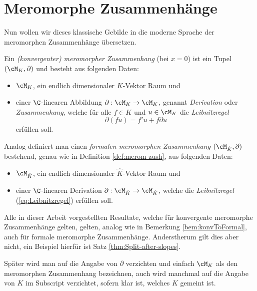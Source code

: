 \section{Meromorphe Zusammenhänge}
Nun wollen wir dieses klassische Gebilde in die moderne Sprache der
meromorphen Zusammenhänge übersetzen.
\begin{defn} \label{def:merom-zush}
Ein \emph{(konvergenter) meromorpher Zusammenhang} (bei $x=0$) ist ein Tupel
$(\cM_K,\partial)$ und besteht aus folgenden Daten:
\begin{itemize}
\item $\cM_K$, ein endlich dimensionaler $K$-Vektor Raum und
\item einer $\C$-linearen Abbildung $\partial:\cM_K\rightarrow \cM_K$,
genannt \emph{Derivation} oder \emph{Zusammenhang}, welche für alle $f\in K$
und $u\in \cM_K$ die \emph{Leibnitzregel}
\begin{equation}\label{eq:Leibnitzregel}
\partial(fu)=f'u+f\partial u %
\end{equation}
erfüllen soll.
\end{itemize}
\end{defn}
\begin{bem} %
Analog definiert man einen \emph{formalen meromorphen Zusammenhang}
$(\cM_{\hat K},\partial)$ bestehend, genau wie in Definition
\ref{def:merom-zush}, aus folgenden Daten:
\begin{itemize}
\item $\cM_{\hat K}$, ein endlich dimensionaler $\hat K$-Vektor Raum und
\item einer $\C$-linearen Derivation $\partial:\cM_{\hat K}\rightarrow
\cM_{\hat K}$, welche die \emph{Leibnitzregel} (\ref{eq:Leibnitzregel})
erfüllen soll.
\end{itemize}
\end{bem}

\begin{bem}
Alle in dieser Arbeit vorgestellten Resultate, welche für konvergente
meromorphe Zusammenhänge gelten, gelten, analog wie in Bemerkung
\ref{bem:konvToFormal}, auch für formale meromorphe Zusammenhänge.
Anderstherum gilt dies aber nicht, ein Beispiel hierfür ist Satz
\ref{thm:Split-after-slopes}.
\end{bem}
\begin{bem}
Später wird man auf die Angabe von $\partial$ verzichten und einfach
$\cM_K$ als den meromorphen Zusammenhang bezeichnen, auch wird manchmal auf die
Angabe von $K$ im Subscript verzichtet, sofern klar ist, welches $K$ gemeint
ist.
\end{bem}

